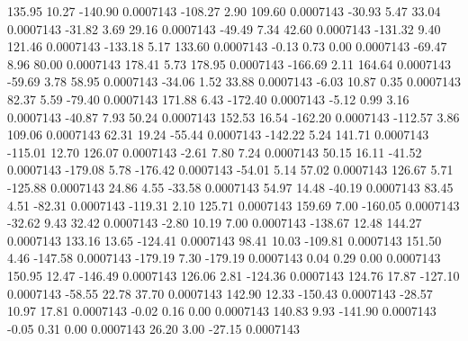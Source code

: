       135.95       10.27     -140.90     0.0007143
     -108.27        2.90      109.60     0.0007143
      -30.93        5.47       33.04     0.0007143
      -31.82        3.69       29.16     0.0007143
      -49.49        7.34       42.60     0.0007143
     -131.32        9.40      121.46     0.0007143
     -133.18        5.17      133.60     0.0007143
       -0.13        0.73        0.00     0.0007143
      -69.47        8.96       80.00     0.0007143
      178.41        5.73      178.95     0.0007143
     -166.69        2.11      164.64     0.0007143
      -59.69        3.78       58.95     0.0007143
      -34.06        1.52       33.88     0.0007143
       -6.03       10.87        0.35     0.0007143
       82.37        5.59      -79.40     0.0007143
      171.88        6.43     -172.40     0.0007143
       -5.12        0.99        3.16     0.0007143
      -40.87        7.93       50.24     0.0007143
      152.53       16.54     -162.20     0.0007143
     -112.57        3.86      109.06     0.0007143
       62.31       19.24      -55.44     0.0007143
     -142.22        5.24      141.71     0.0007143
     -115.01       12.70      126.07     0.0007143
       -2.61        7.80        7.24     0.0007143
       50.15       16.11      -41.52     0.0007143
     -179.08        5.78     -176.42     0.0007143
      -54.01        5.14       57.02     0.0007143
      126.67        5.71     -125.88     0.0007143
       24.86        4.55      -33.58     0.0007143
       54.97       14.48      -40.19     0.0007143
       83.45        4.51      -82.31     0.0007143
     -119.31        2.10      125.71     0.0007143
      159.69        7.00     -160.05     0.0007143
      -32.62        9.43       32.42     0.0007143
       -2.80       10.19        7.00     0.0007143
     -138.67       12.48      144.27     0.0007143
      133.16       13.65     -124.41     0.0007143
       98.41       10.03     -109.81     0.0007143
      151.50        4.46     -147.58     0.0007143
     -179.19        7.30     -179.19     0.0007143
        0.04        0.29        0.00     0.0007143
      150.95       12.47     -146.49     0.0007143
      126.06        2.81     -124.36     0.0007143
      124.76       17.87     -127.10     0.0007143
      -58.55       22.78       37.70     0.0007143
      142.90       12.33     -150.43     0.0007143
      -28.57       10.97       17.81     0.0007143
       -0.02        0.16        0.00     0.0007143
      140.83        9.93     -141.90     0.0007143
       -0.05        0.31        0.00     0.0007143
       26.20        3.00      -27.15     0.0007143
